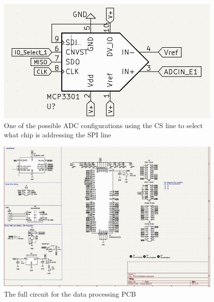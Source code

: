 \begin{figure} [H]
\begin{center}
\includegraphics[scale=0.40]{images/ADC_CS_select.jpg}
   \caption{One of the possible ADC configurations using the CS line to select what chip is addressing the SPI line}
    \label{fig:ADC_CS}
\end{center}
\end{figure}
\begin{figure} [H]
\begin{center}
\includegraphics[scale=0.60,angle=-90]{images/FullcircMCU.jpg}
   \caption{The full circuit for the data processing PCB}
    \label{fig:MCUcirc}
\end{center}
\end{figure}

